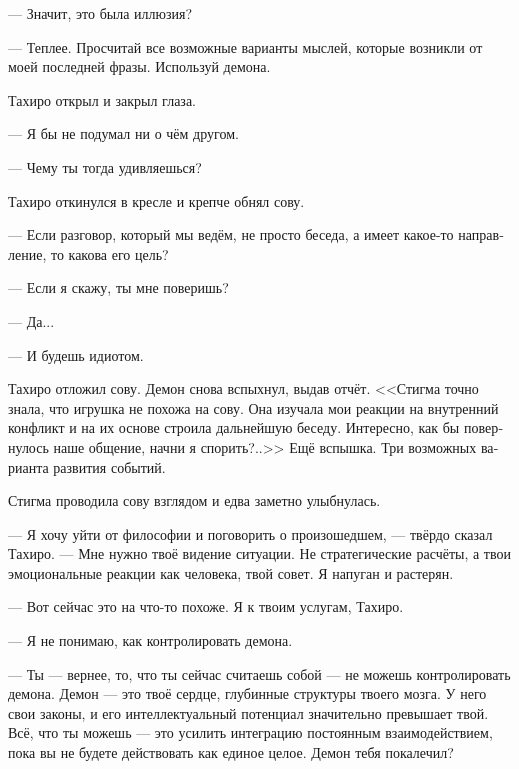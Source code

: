 \documentclass[a4paper,12pt,fleqn]{book}\usepackage{polyglossia}\setdefaultlanguage[babelshorthands=true]{russian}\setotherlanguage{english}\defaultfontfeatures{Ligatures=TeX,Mapping=tex-text}\usepackage{xcolor}\newcommand{\ml}[3]{#2}
\begin{document}
{--- Значит, это была иллюзия?

--- Теплее.
Просчитай все возможные варианты мыслей, которые возникли от моей последней фразы.
\ml{$0$}
{Используй демона.}
{Use your daemon.''}

Тахиро открыл и закрыл глаза.

\ml{$0$}
{--- Я бы не подумал ни о чём другом.}
{``I wouldn't think of anything else.''}

\ml{$0$}
{--- Чему ты тогда удивляешься?}
{``Why you're surprised, then?''}

Тахиро откинулся в кресле и крепче обнял сову.

--- Если разговор, который мы ведём, не просто беседа, а имеет какое-то направление, то какова его цель?

\ml{$0$}
{--- Если я скажу, ты мне поверишь?}
{``If I tell you, would you believe?''}

\ml{$0$}
{--- Да...}
{``Yes ...''}

\ml{$0$}
{--- И будешь идиотом.}
{``You'd be an idiot as well.''}

Тахиро отложил сову.
Демон снова вспыхнул, выдав отчёт.
\ml{$0$}
{<<Стигма точно знала, что игрушка не похожа на сову.}
{\textit{Stigma knew for sure that the toy is not looking like an owl.}}
Она изучала мои реакции на внутренний конфликт и на их основе строила дальнейшую беседу.
Интересно, как бы повернулось наше общение, начни я спорить?..>>
Ещё вспышка.
Три возможных варианта развития событий.

Стигма проводила сову взглядом и едва заметно улыбнулась.

--- Я хочу уйти от философии и поговорить о произошедшем, --- твёрдо сказал Тахиро.
--- Мне нужно твоё видение ситуации.
Не стратегические расчёты, а твои эмоциональные реакции как человека, твой совет.
Я напуган и растерян.

--- Вот сейчас это на что-то похоже.
Я к твоим услугам, Тахиро.

--- Я не понимаю, как контролировать демона.

--- Ты --- вернее, то, что ты сейчас считаешь собой --- не можешь контролировать демона.
Демон --- это твоё сердце, глубинные структуры твоего мозга.
У него свои законы, и его интеллектуальный потенциал значительно превышает твой.
\ml{$0$}
{Всё, что ты можешь --- это усилить интеграцию постоянным взаимодействием, пока вы не будете действовать как единое целое.}
{The only thing you can do is to strengthen the integration by permanent interaction, until you both start to perform as one.''}
Демон тебя покалечил?

}
\end{document}
